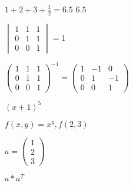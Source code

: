 $1+2+3+\frac{1}{2}=6.5$
$6.5$

$\begin{vmatrix}1&1&1\\0&1&1\\0&0&1\end{vmatrix}=1$

$\begin{pmatrix}1&1&1\\0&1&1\\0&0&1\end{pmatrix}^{-1}=\begin{pmatrix}
1 &-1 &0 \\
0 &1 &-1 \\
0 &0 &1
\end{pmatrix}$

$(x+1)^5$

$f(x,y)=x^y, f(2,3)$

$a=\begin{pmatrix}1\\2\\3\end{pmatrix}$

$a*a^T$